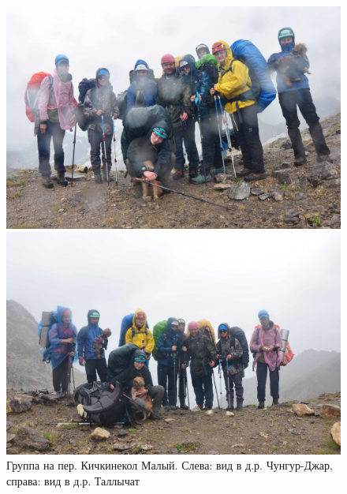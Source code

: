 \begin{figure}[h!]
	\centering
	\begin{minipage}[h]{0.48\linewidth}
		\includegraphics[width=0.99\linewidth]{../pics/DSC_0239.jpg}
	\end{minipage}
	\quad
	\begin{minipage}[h]{0.48\linewidth}
		\includegraphics[width=0.99\linewidth]{../pics/DSC_0242.jpg}
	\end{minipage}
	\caption{Группа на пер. Кичкинекол Малый. Слева: вид в д.р. Чунгур-Джар, справа: вид в д.р. Таллычат}
	\label{fig:DSC_0239}
\end{figure}

